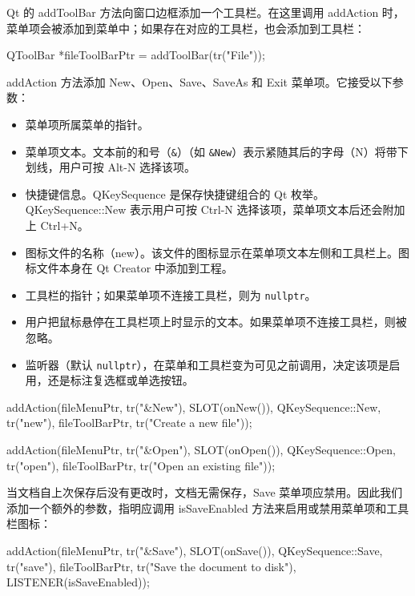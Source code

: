 Qt 的 addToolBar 方法向窗口边框添加一个工具栏。在这里调用 addAction 时，菜单项会被添加到菜单中；如果存在对应的工具栏，也会添加到工具栏：

\begin{codebox}
  QToolBar *fileToolBarPtr = addToolBar(tr("File"));
\end{codebox}

addAction 方法添加 New、Open、Save、SaveAs 和 Exit 菜单项。它接受以下参数：

\begin{itemize}
\item 菜单项所属菜单的指针。
\item 菜单项文本。文本前的和号（\texttt{\&}）（如 \texttt{\&New}）表示紧随其后的字母（N）将带下划线，用户可按 Alt-N 选择该项。
\item 快捷键信息。QKeySequence 是保存快捷键组合的 Qt 枚举。QKeySequence::New 表示用户可按 Ctrl-N 选择该项，菜单项文本后还会附加上 Ctrl+N。
\item 图标文件的名称（new）。该文件的图标显示在菜单项文本左侧和工具栏上。图标文件本身在 Qt Creator 中添加到工程。
\item 工具栏的指针；如果菜单项不连接工具栏，则为 \texttt{nullptr}。
\item 用户把鼠标悬停在工具栏项上时显示的文本。如果菜单项不连接工具栏，则被忽略。
\item 监听器（默认 \texttt{nullptr}），在菜单和工具栏变为可见之前调用，决定该项是启用，还是标注复选框或单选按钮。
\end{itemize}

\begin{codebox}
  addAction(fileMenuPtr, tr("&New"), SLOT(onNew()),
            QKeySequence::New, tr("new"), fileToolBarPtr,
            tr("Create a new file"));

  addAction(fileMenuPtr, tr("&Open"), SLOT(onOpen()),
            QKeySequence::Open, tr("open"), fileToolBarPtr,
            tr("Open an existing file"));
\end{codebox}

当文档自上次保存后没有更改时，文档无需保存，Save 菜单项应禁用。因此我们添加一个额外的参数，指明应调用 isSaveEnabled 方法来启用或禁用菜单项和工具栏图标：

\begin{codebox}
  addAction(fileMenuPtr, tr("&Save"), SLOT(onSave()),
            QKeySequence::Save, tr("save"), fileToolBarPtr,
            tr("Save the document to disk"),
            LISTENER(isSaveEnabled));
\end{codebox}

